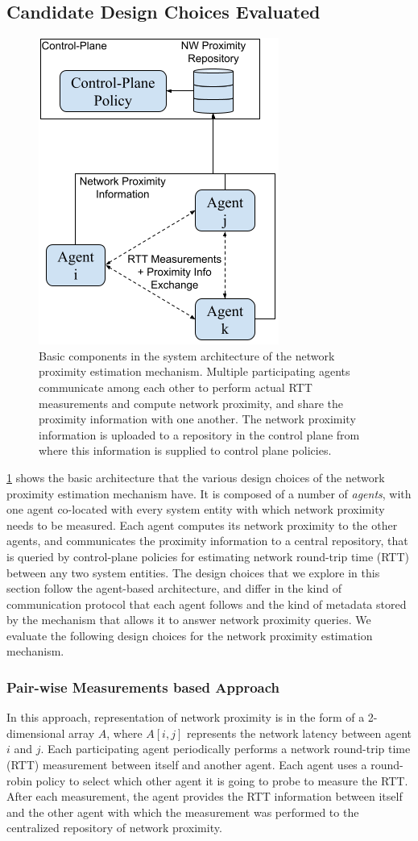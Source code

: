 \subsection{Candidate Design Choices Evaluated}
\begin{figure}
\centering
\includegraphics[width=0.4\linewidth]{figures/design_space/nw_prox/basic_sys_arch.png}
\caption{Basic components in the system architecture of the network proximity estimation mechanism. Multiple participating agents communicate among each other to perform actual RTT measurements and compute network proximity, and share the proximity information with one another. The network proximity information is uploaded to a repository in the control plane from where this information is supplied to control plane policies.}
\label{fig:nw_prox_arch}
\end{figure}
\cref{fig:nw_prox_arch} shows the basic architecture that the various design choices of the network proximity estimation mechanism have. It is composed of a number of \textit{agents}, with one agent co-located with every system entity with which network proximity needs to be measured. Each agent computes its network proximity to the other agents, and communicates the proximity information to a central repository, that is queried by control-plane policies for estimating network round-trip time (RTT) between any two system entities. The design choices that we explore in this section follow the agent-based architecture, and differ in the kind of communication protocol that each agent follows and the kind of metadata stored by the mechanism that allows it to answer network proximity queries. We evaluate the following design choices for the network proximity estimation mechanism. 
\subsubsection{Pair-wise Measurements based Approach}
In this approach, representation of network proximity is in the form of a 2-dimensional array $A$, where $A [ i, j ]$ represents the network latency between agent $i$ and $j$. Each participating agent periodically performs a network round-trip time (RTT) measurement between itself and another agent. Each agent uses a round-robin policy to select which other agent it is going to probe to measure the RTT. After each measurement, the agent provides the RTT information between itself and the other agent with which the measurement was performed to the centralized repository of network proximity.

